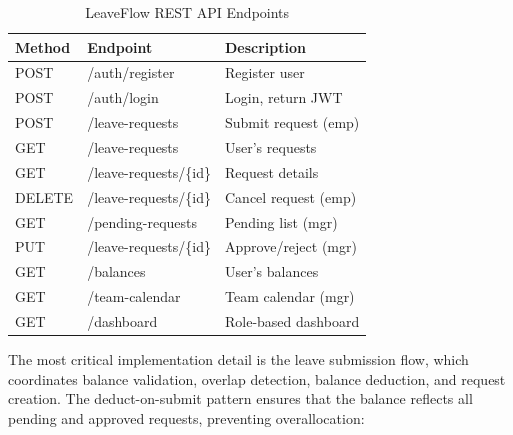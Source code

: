 \documentclass[conference]{IEEEtran}
\begin{document}
\begin{table}[H]
\centering
\caption{LeaveFlow REST API Endpoints}
\label{tab:endpoints}
\begin{tabular}{|l|l|l|}
\hline
\textbf{Method} & \textbf{Endpoint} & \textbf{Description} \\
\hline
POST & /auth/register & Register user \\
POST & /auth/login & Login, return JWT \\
\hline
POST & /leave-requests & Submit request (emp) \\
GET & /leave-requests & User's requests \\
GET & /leave-requests/\{id\} & Request details \\
DELETE & /leave-requests/\{id\} & Cancel request (emp) \\
\hline
GET & /pending-requests & Pending list (mgr) \\
PUT & /leave-requests/\{id\} & Approve/reject (mgr) \\
\hline
GET & /balances & User's balances \\
GET & /team-calendar & Team calendar (mgr) \\
GET & /dashboard & Role-based dashboard \\
\hline
\end{tabular}
\end{table}

The most critical implementation detail is the leave submission flow, which coordinates balance validation, overlap detection, balance deduction, and request creation. The deduct-on-submit pattern ensures that the balance reflects all pending and approved requests, preventing overallocation:
\end{document}
